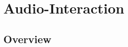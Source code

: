 \documentclass{article}
\begin{document}
\section{Audio-Interaction}
\vspace{-2mm}
\subsection{Overview}
\vspace{-2mm}
\end{document}
